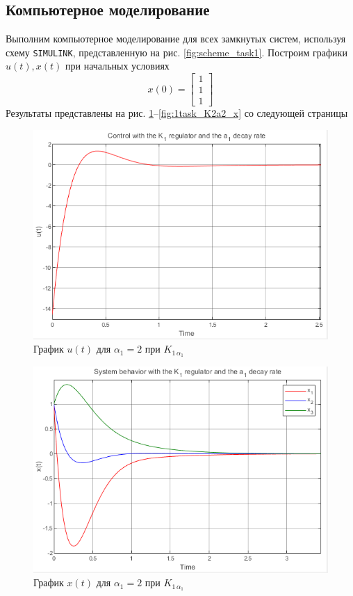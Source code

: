 \documentclass[a4paper, 12pt]{article}
\begin{document}
    \subsection{Компьютерное моделирование}
    Выполним компьютерное моделирование для всех замкнутых систем, используя схему \texttt{SIMULINK},
    представленную на рис. \ref{fig:scheme_task1}. Построим графики $u(t),x(t)$ при начальных условиях
    $$x(0)=\begin{bmatrix}
        1 \\1 \\1
    \end{bmatrix}$$
    Результаты представлены на рис. \ref{fig:1task_K1a1_u}--\ref{fig:1task_K2a2_x} со следующей страницы
    \newpage
    \vspace*{0.01mm}
    \begin{figure}[H]
        \centering
        \includegraphics{1task_K1a1_u.png}
        \captionsetup{skip=0pt}
        \caption{График $u(t)$ для $\alpha_1=2$ при $K_{1\,\alpha_1}$}
        \label{fig:1task_K1a1_u}
    \end{figure}
    \begin{figure}[H]
        \centering
        \includegraphics{1task_K1a1_x.png}
        \captionsetup{skip=0pt}
        \caption{График $x(t)$ для $\alpha_1=2$ при $K_{1\,\alpha_1}$}
        \label{fig:1task_K1a1_x}
    \end{figure}
\end{document}
